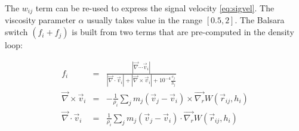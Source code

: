 \documentclass[a4paper,10pt]{report}
\begin{document}
The $w_{ij}$ term can be re-used to express the signal velocity \ref{eq:sigvel}. The viscosity parameter $\alpha$
usually takes value in the range $[0.5, 2]$. The Balsara switch $(f_i+f_j)$ is built from two terms that are
pre-computed in the density loop:

\begin{eqnarray*}
 f_i &=& \frac{|\vec\nabla \cdots \vec{v}_i|}{|\vec\nabla \cdot \vec{v}_i| + |\vec\nabla \times \vec{v}_i| +
10^{-4}\frac{c_j}{h_j}} \\
 \vec\nabla \times \vec{v}_i &=& -\frac{1}{\rho_i}\sum_j m_j (\vec{v}_j - \vec{v}_i)\times
\vec{\nabla_r}W(\vec{r}_{ij}, h_i) \\
 \vec\nabla \cdot \vec{v}_i &=& \frac{1}{\rho_i}\sum_j m_j (\vec{v}_j - \vec{v}_i)\cdot \vec{\nabla_r}W(\vec{r}_{ij},
h_i)
\end{eqnarray*}
\end{document}
